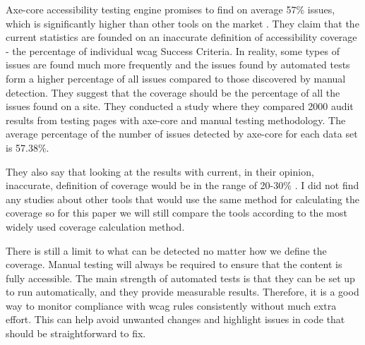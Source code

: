 \documentclass{master_thesis}
\begin{document}
Axe-core accessibility testing engine promises to find on average 57\% issues, which is significantly higher than other tools on the market \citep{Deque2023}. They claim that the current statistics are founded on an inaccurate definition of accessibility coverage - the percentage of individual \ac{wcag} Success Criteria. In reality, some types of issues are found much more frequently and the issues found by automated tests form a higher percentage of all issues compared to those discovered by manual detection. They suggest that the coverage should be the percentage of all the issues found on a site. They conducted a study where they compared 2000 audit results from testing pages with axe-core and manual testing methodology. The average percentage of the number of issues detected by axe-core for each data set is 57.38\%.

They also say that looking at the results with current, in their opinion, inaccurate, definition of coverage would be in the range of 20-30\% \citep{DequeSystems2021report}. I did not find any studies about other tools that would use the same method for calculating the coverage so for this paper we will still compare the tools according to the most widely used coverage calculation method.

There is still a limit to what can be detected no matter how we define the coverage.
Manual testing will always be required to ensure that the content is fully accessible. The main strength of automated tests is that they can be set up to run automatically, and they provide measurable results. Therefore, it is a good way to monitor compliance with \ac{wcag} rules consistently without much extra effort. This can help avoid unwanted changes and highlight issues in code that should be straightforward to fix.
\end{document}

